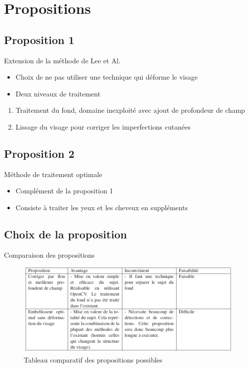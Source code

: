 \documentclass{beamer}
\begin{document}
\section{Propositions}
\subsection{Proposition 1}
\begin{frame}{Extension de la méthode de Lee et Al.}
\begin{itemize}
\item Choix de ne pas utiliser une technique qui déforme le visage
\item Deux niveaux de traitement
\end{itemize}
\begin{enumerate}
\item Traitement du fond, domaine inexploité avec ajout de profondeur de champ
\item Lissage du visage pour corriger les imperfections cutanées
\end{enumerate}
\end{frame}
\subsection{Proposition 2}
\begin{frame}{Méthode de traitement optimale}
\begin{itemize}
\item Complément de la proposition 1
\item Consiste à traiter les yeux et les cheveux en suppléments 
\end{itemize}
\end{frame}
\subsection{Choix de la proposition}
\begin{frame}{Comparaison des propositions}

\begin{center}
\begin{figure}
    \includegraphics[width=1.0\textwidth]{TableauCompProp}
	\caption{Tableau comparatif des propositions possibles}
	\label{fig:tabcompprop}
\end{figure}
\end{center}
\end{frame}
\end{document}
